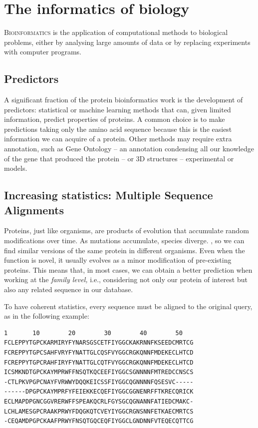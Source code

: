\chapter{The informatics of biology}
\lettrine[lines=3, lhang=0.3, nindent=0em]{\color{Maroon}B}{ioinformatics}
is the application of computational methods to biological problems,
either by analysing large amounts of data or by replacing experiments with computer programs.

\section{Predictors}
A significant fraction of the protein bioinformatics work is the development of predictors: statistical or machine learning methods that can, given limited information, predict properties of proteins.
A common choice is to make predictions taking only the amino acid sequence because this is the easiest information we can acquire of a protein.
Other methods may require extra annotation, such as Gene Ontology -- an annotation condensing all our knowledge of the gene that produced the protein -- or 3D structures -- experimental or models.

\section[Multiple Sequence Alignments]{Increasing statistics: Multiple Sequence Alignments}
Proteins, just like organisms, are products of evolution that accumulate random modifications over time.
As mutations accumulate, species diverge.
, so we can find similar versions of the same protein in different organisms.
Even when the function is novel, it usually evolves as a minor modification of pre-existing proteins.
This means that, in most cases, we can obtain a better prediction when working at the \emph{family level,}
i.e., considering not only our protein of interest but also any related sequence in our database.

To have coherent statistics, every sequence must be aligned to the original query, as in the following example:

\begin{center}
\marginpar{\phantom{a}}
\marginpar{\phantom{a}}
\marginpar{\phantom{a}}
\begin{Verbatim}[fontsize=\small, xleftmargin=3em]
1       10        20        30        40        50   
FCLEPPYTGPCKARMIRYFYNARSGSCETFIYGGCKAKRNNFKSEEDCMRTCG
FCREPPYTGPCSAHFVRYFYNATTGLCQSFVYGGCRGKQNNFMDEKECLHTCD
FCREPPYTGPCRAHFIRYFYNATTGLCQTFVYGGCRGKQNNFMDEKECLHTCD
ICSMKNDTGPCKAYMPRWFFNSQTKQCEEFIYGGCSGNNNNFMTREDCCNSCS
-CTLPKVPGPCNAYFVRWWYDQQKEICSSFIYGGCQGNNNNFQSESVC-----
------DPGPCKAYMPRFYFEIEKKECQEFIYGGCGGNENRFFTKRECQRICK
ECLMAPDPGNCGGVRERWFFSPEAKQCRLFGYSGCQGNANNFATIEDCMAKC-
LCHLAMESGPCRAAKPRWYFDQGKQTCVEYIYGGCRGNSNNFETKAECMRTCS
-CEQAMDPGPCKAAFPRWYFNSQTGQCEQFIYGGCLGNDNNFVTEQECQTTCG
\end{Verbatim}
\end{center}

